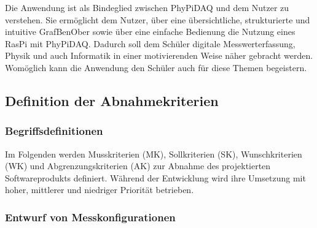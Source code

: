 \documentclass[parskip=full]{scrartcl}
\begin{document}
Die Anwendung ist als Bindeglied zwischen \gls{PhyPiDAQ} und dem Nutzer zu verstehen. Sie ermöglicht dem Nutzer, über eine übersichtliche, strukturierte und intuitive \gls{GrafBenOber} sowie über eine einfache Bedienung die Nutzung eines \gls{RasPi} mit \gls{PhyPiDAQ}. Dadurch soll dem Schüler digitale Messwerterfassung, Physik und auch Informatik in einer motivierenden Weise näher gebracht werden. Womöglich kann die Anwendung den Schüler auch für diese Themen begeistern.  

\subsection{Definition der Abnahmekriterien}

\subsubsection{Begriffsdefinitionen}

Im Folgenden werden \gls{Musskriterien} (MK), \gls{Sollkriterien} (SK), \gls{Wunschkriterien} (WK) und \gls{Abgrenzungskriterien} (AK) zur Abnahme des projektierten Softwareprodukts definiert. Während der Entwicklung wird ihre Umsetzung mit hoher, mittlerer und niedriger Priorität betrieben.

\newtheorem{MussKrit}{MK}
\newtheorem{SollKrit}{SK}
\newtheorem{WunschKrit}{WK}


\subsubsection{Entwurf von Messkonfigurationen}
\end{document}
